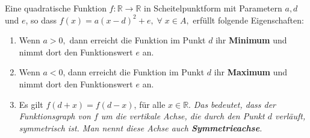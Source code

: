 \documentclass[12pt]{article}
\begin{document}
\begin{proposition}\label{satz:eigenschaften_quad_func}
Eine quadratische Funktion $f: \mathbb{R} \rightarrow \mathbb{R}$ in Scheitelpunktform mit Parametern $a, d$ und $e$, so dass $f(x) = a(x-d)^2 + e, \; \forall \; x \in A,$ erfüllt folgende Eigenschaften:
\begin{enumerate}
\item Wenn $a > 0,$ dann erreicht die Funktion im Punkt $d$ ihr \textbf{Minimum} und nimmt dort den Funktionswert $e$ an.
\item Wenn $a < 0$, dann erreicht die Funktion im Punkt $d$ ihr \textbf{Maximum} und nimmt dort den Funktionswert $e$ an.
\item Es gilt $f(d+x) = f(d-x)$, für alle $x\in \mathbb{R}$.
\emph{Das bedeutet, dass der Funktionsgraph von $f$ um die vertikale Achse, die durch den Punkt $d$ verläuft, symmetrisch ist. Man nennt diese Achse auch \textbf{Symmetrieachse}.}
\end{enumerate}
\end{proposition}
\end{document}
